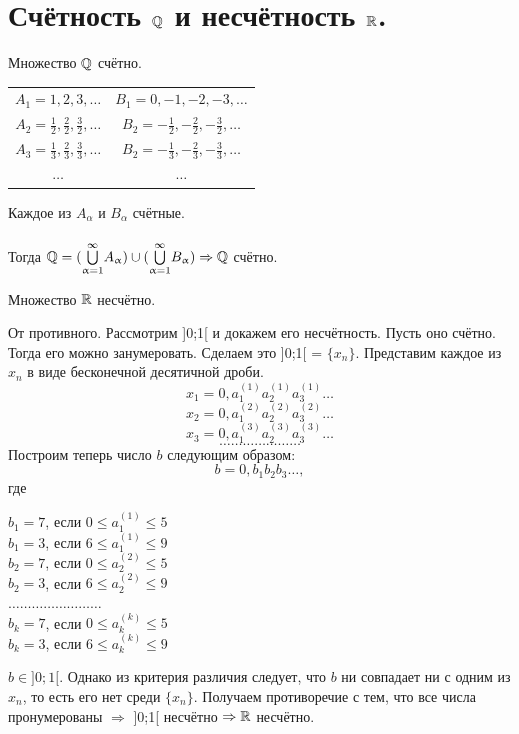 \section{Счётность $\mathbb{Q}$ и несчётность $\mathbb{R}$.}
\begin{theorem}
	Множество $\mathbb{Q}$ счётно.
\end{theorem}
\begin{Proof}
	\begin{center}
		\begin{tabular}{cc}
			$A_1 = 1, 2, 3, \dotsc$ & $B_1 = 0, -1, -2, -3, \dotsc$\\
			$A_2 = \frac{1}{2}, \frac{2}{2}, \frac{3}{2}, \dotsc$ & $B_2 = -\frac{1}{2}, -\frac{2}{2}, -\frac{3}{2}, \dotsc$\\
			$A_3 = \frac{1}{3}, \frac{2}{3}, \frac{3}{3}, \dotsc$ & $B_2 = -\frac{1}{3}, -\frac{2}{3}, -\frac{3}{3}, \dotsc$\\
			$\dots$ & $\dots$
		\end{tabular}
	\end{center} 
	Каждое из $A_\alpha$ и $B_\alpha$ счётные.\\\\
	Тогда $\mathbb{Q} = (\overset{\infty}{\underset{\upalpha=1}{\bigcup}} A_\upalpha) \cup (\overset{\infty}{\underset{\upalpha=1}{\bigcup}} B_\upalpha) \Rightarrow \mathbb{Q}$ счётно.
\end{Proof}
\begin{theorem}
	Множество $\mathbb{R}$ несчётно.
\end{theorem}
\begin{Proof}
	От противного. Рассмотрим ]0;1[ и докажем его несчётность. Пусть оно счётно. Тогда его можно занумеровать. Сделаем это ]0;1[ = $\{x_n\}$. Представим каждое из $x_n$ в виде бесконечной десятичной дроби.\\
	\[x_1 = 0,a_1^{(1)}a_2^{(1)}a_3^{(1)}\dotsc\]
	\[x_2 = 0,a_1^{(2)}a_2^{(2)}a_3^{(2)}\dotsc\]
	\[x_3 = 0,a_1^{(3)}a_2^{(3)}a_3^{(3)}\dotsc\]
	$$\dots\dots\dots\dots\dots\dots\dots$$
	Построим теперь число $b$ следующим образом:\\
	$$b = 0,b_1b_2b_3\dotsc,$$ где
	\begin{center}
		$b_1 = 7$, если  $0 \leq a_1^{(1)} \leq 5$\\
		$b_1 = 3$, если  $6 \leq a_1^{(1)} \leq 9$\\
		$b_2 = 7$, если  $0 \leq a_2^{(2)} \leq 5$\\
		$b_2 = 3$, если  $6 \leq a_2^{(2)} \leq 9$\\
		$\dots\dots\dots\dots\dots\dots\dots\dots$\\
		$b_k = 7$, если $0 \leq a_k^{(k)} \leq 5$\\
		$b_k = 3$, если $6 \leq a_k^{(k)} \leq 9$
	\end{center} 
	$b \in ]0;1[ $. Однако из критерия различия следует, что $b$ ни совпадает ни с одним из $x_n$, то есть его нет среди $\{x_n\}$. Получаем  противоречие с тем, что все числа пронумерованы $\Rightarrow$ ]0;1[ несчётно $\Rightarrow \mathbb{R}$  несчётно.
\end{Proof}
